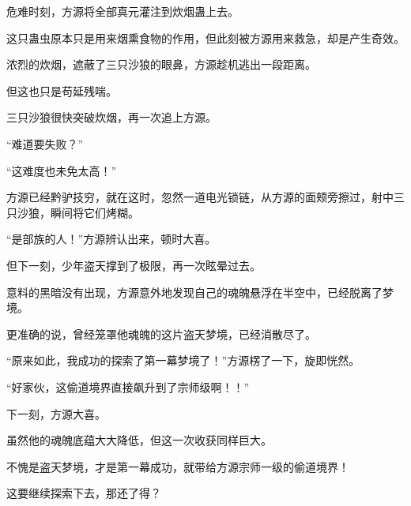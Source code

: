 \begin{this_body}
危难时刻，方源将全部真元灌注到炊烟蛊上去。

这只蛊虫原本只是用来烟熏食物的作用，但此刻被方源用来救急，却是产生奇效。

浓烈的炊烟，遮蔽了三只沙狼的眼鼻，方源趁机逃出一段距离。

但这也只是苟延残喘。

三只沙狼很快突破炊烟，再一次追上方源。

“难道要失败？”

“这难度也未免太高！”

方源已经黔驴技穷，就在这时，忽然一道电光锁链，从方源的面颊旁擦过，射中三只沙狼，瞬间将它们烤糊。

“是部族的人！”方源辨认出来，顿时大喜。

但下一刻，少年盗天撑到了极限，再一次眩晕过去。

意料的黑暗没有出现，方源意外地发现自己的魂魄悬浮在半空中，已经脱离了梦境。

更准确的说，曾经笼罩他魂魄的这片盗天梦境，已经消散尽了。

“原来如此，我成功的探索了第一幕梦境了！”方源楞了一下，旋即恍然。

“好家伙，这偷道境界直接飙升到了宗师级啊！！”

下一刻，方源大喜。

虽然他的魂魄底蕴大大降低，但这一次收获同样巨大。

不愧是盗天梦境，才是第一幕成功，就带给方源宗师一级的偷道境界！

这要继续探索下去，那还了得？

\end{this_body}


